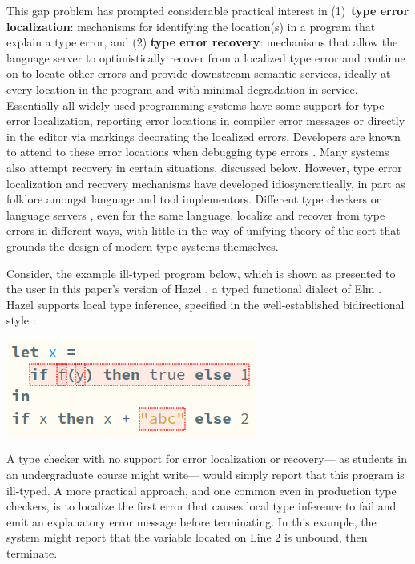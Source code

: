 This gap problem has prompted considerable practical interest in 
(1)~\textbf{type error localization}: mechanisms for identifying the location(s) in a program that explain a type error, and 
(2) \textbf{type error recovery}: mechanisms that allow the language server to optimistically recover from a localized type error 
and continue on to locate other errors and provide downstream semantic services, 
ideally at every location in the program and with minimal degradation in service.
Essentially all widely-used programming systems have some support for type error localization, 
reporting error locations in compiler error messages 
or directly in the editor via markings decorating the localized errors. Developers are known to attend to these error locations when debugging type errors \cite{DBLP:journals/jfp/JoostenBH93}.
Many systems also attempt recovery in certain situations, discussed below. 
However, type error localization and recovery mechanisms have developed idiosyncratically, 
in part as folklore amongst language and tool implementors. 
Different type checkers or language servers \cite{barros2022editing,bour2018merlin}, even for the same language, localize and recover from type errors in different ways, 
with little in the way of unifying theory of the sort that grounds the design of modern type systems themselves.

Consider, the example ill-typed program below, which is shown as presented to the user in
this paper's version of Hazel \cite{hazel}, a typed functional dialect of Elm \cite{elm}. Hazel  
supports local type inference, specified in the well-established bidirectional style \cite{Localinf,HazelnutPOPL,BidirTyping}:
\vspace{-3px}
\begin{center}
    \includegraphics[scale=0.5]{images/hazel-intro-screenshot-v3.png}
\end{center}
\vspace{-3px}
A type checker with no support for error localization or recovery---%
as students in an undergraduate course might write---%
would simply report that this program is ill-typed. 
A more practical approach, and one common even in production type checkers, 
is to localize the first error that causes local type inference to fail and emit an explanatory error message before terminating.
In this example, the system might report that the variable  located on Line 2 is unbound, then terminate.

